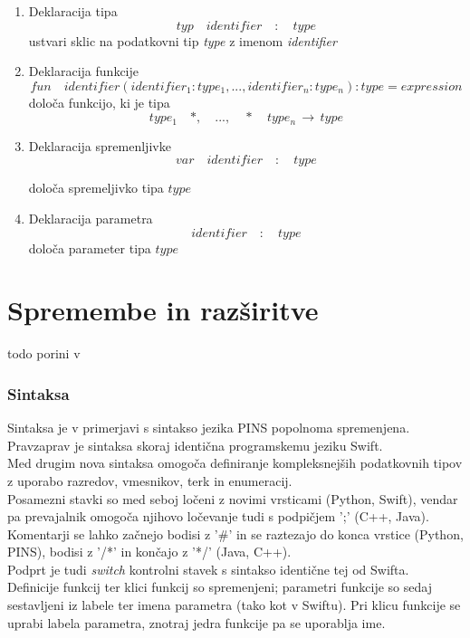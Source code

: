 \documentclass[a4paper, 12pt]{book}
\begin{document}
\begin{enumerate}
	\item Deklaracija tipa
\[
typ\quad  identifier\quad  :\quad  type
\]
	ustvari sklic na podatkovni tip \textit{type} z imenom \textit{identifier}
	\item Deklaracija funkcije
\[ fun\quad identifier  ( identifier_1 : type_1, ..., identifier_n : type_n ) : type = expression \]
	določa funkcijo, ki je tipa \[type_1 \quad *, \quad  ..., \quad *\quad  type_n \,\to\, type \]
	\item Deklaracija spremenljivke
\[
var \quad identifier\quad :\quad type
\]

določa spremeljivko tipa $type$
	\item Deklaracija parametra
\[
identifier \quad :\quad type
\]
določa parameter tipa $type$
\end{enumerate}

\section{Spremembe in razširitve}

todo porini v 

\subsubsection{Sintaksa}

Sintaksa je v primerjavi s sintakso jezika PINS popolnoma spremenjena. Pravzaprav je sintaksa skoraj identična programskemu jeziku Swift. \\
\indent Med drugim nova sintaksa omogoča definiranje kompleksnejših podatkovnih tipov z uporabo razredov, vmesnikov, terk in enumeracij. \\
\indent Posamezni stavki so med seboj ločeni z novimi vrsticami (Python, Swift), vendar pa prevajalnik omogoča njihovo ločevanje tudi s podpičjem ';' (C++, Java). \\
\indent Komentarji se lahko začnejo bodisi z '\#' in se raztezajo do konca vrstice (Python, PINS), bodisi z '/*' in končajo z '*/' (Java, C++). \\
\indent Podprt je tudi \textit{switch} kontrolni stavek s sintakso identične tej od Swifta.\\
\indent Definicije funkcij ter klici funkcij so spremenjeni; parametri funkcije so sedaj sestavljeni iz labele ter imena parametra (tako kot v Swiftu). Pri klicu funkcije se uprabi labela parametra, znotraj jedra funkcije pa se uporablja ime.
\end{document}
